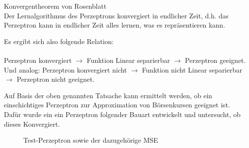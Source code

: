 \begin{theo}Konvergentheorem von Rosenblatt\\
Der Lernalgorithmus des Perzeptrons konvergiert in endlicher Zeit, d.h. das Perzeptron kann in endlicher Zeit alles lernen, was es repräsentieren kann.
\end{theo}

Es ergibt sich also folgende Relation:\\\\
Perzeptron konvergiert $\rightarrow$ Funktion Linear separierbar $\rightarrow$ Perzeptron geeignet.
Und analog: Perzeptron konvergiert nicht $\rightarrow$ Funktion nicht Linear separierbar $\rightarrow$ Perzeptron nicht geeignet.

Auf Basis der oben genannten Tatsache kann ermittelt werden, ob ein einschichtiges Perzeptron zur Approximation von Börsenkursen geeignet ist. Dafür wurde ein ein Perzeptron folgender Bauart entwickelt und untersucht, ob dieses Konvergiert.
\begin{figure}[H]
\hfill
{}
\hfill
{}
\hfill
\caption{Test-Perzeptron sowie der dazugehörige MSE}
\end{figure}

